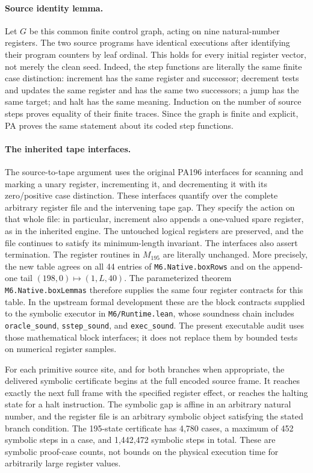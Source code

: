 \paragraph{Source identity lemma.}
Let $G$ be this common finite control graph, acting on nine natural-number
registers. The two source programs have identical executions after
identifying their program counters by leaf ordinal. This holds for every
initial register vector, not merely the clean seed. Indeed, the step
functions are literally the same finite case distinction: increment has
the same register and successor; decrement tests and updates the same
register and has the same two successors; a jump has the same target;
and halt has the same meaning. Induction on the number of source steps
proves equality of their finite traces. Since the graph is finite and
explicit, PA proves the same statement about its coded step functions.

\paragraph{The inherited tape interfaces.}
The source-to-tape argument uses the original PA196 interfaces for
scanning and marking a unary register, incrementing it, and decrementing
it with its zero/positive case distinction. These interfaces quantify
over the complete arbitrary register file and the intervening tape gap.
They specify the action on that whole file: in particular, increment
also appends a one-valued spare register, as in the inherited engine.
The untouched logical registers are preserved, and the file continues
to satisfy its minimum-length invariant. The interfaces also assert
termination. The register routines in $M_{195}$ are literally unchanged.
More precisely, the new table agrees on all 44 entries of
\texttt{M6.Native.boxRows} and on the append-one tail
$(198,0)\mapsto(1,L,40)$. The parameterized theorem
\texttt{M6.Native.boxLemmas} therefore supplies the same four register
contracts for this table. In the upstream formal development these are
the block contracts supplied to the symbolic executor in
\texttt{M6/Runtime.lean}, whose soundness chain includes
\texttt{oracle\_sound}, \texttt{sstep\_sound}, and
\texttt{exec\_sound}. The present executable audit uses those mathematical
block interfaces; it does not replace them by bounded tests on numerical
register samples.

For each primitive source site, and for both branches when appropriate,
the delivered symbolic certificate begins at the full encoded source
frame. It reaches exactly the next full frame with the specified register
effect, or reaches the halting state for a halt instruction. The symbolic
gap is affine in an arbitrary natural number, and the register file is
an arbitrary symbolic object satisfying the stated branch condition.
The 195-state certificate has 4,780 cases, a maximum of 452 symbolic
steps in a case, and 1,442,472 symbolic steps in total. These are symbolic
proof-case counts, not bounds on the physical execution time for
arbitrarily large register values.

